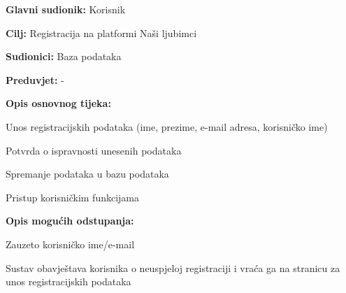 				\noindent {}
				\begin{packed_item}
					
					\item \textbf{Glavni sudionik: } Korisnik
					\item  \textbf{Cilj:} Registracija na platformi Naši ljubimci
					\item  \textbf{Sudionici:} Baza podataka
					\item  \textbf{Preduvjet:} -
					\item  \textbf{Opis osnovnog tijeka:}
					
					\item[] \begin{packed_enum}
						
						\item Unos registracijskih podataka (ime, prezime, e-mail adresa, korisničko ime)
						\item Potvrda o ispravnosti unesenih podataka
						\item Spremanje podataka u bazu podataka
						\item Pristup korisničkim funkcijama
					\end{packed_enum}
					
					\item  \textbf{Opis mogućih odstupanja:}
					
					\item[] \begin{packed_item}
						
						\item[2.a] Zauzeto korisničko ime/e-mail
						\item[] \begin{packed_enum}
							\item Sustav obavještava korisnika o neuspjeloj registraciji i vraća  ga na stranicu za unos registracijskih podataka
							
						\end{packed_enum}
						
					\end{packed_item}
				\end{packed_item}
				
